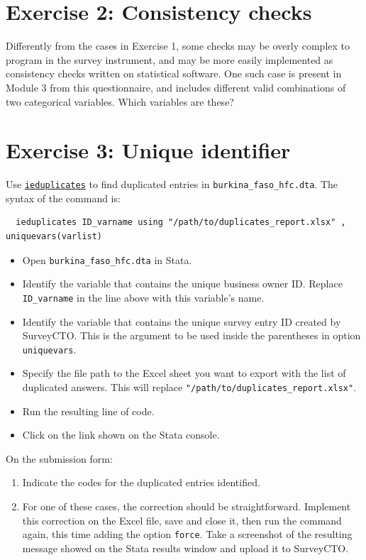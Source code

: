 \documentclass{tufte-handout}
\begin{document}
\section{Exercise 2: Consistency checks}
Differently from the cases in Exercise 1, some checks may be overly complex to program in the survey instrument, and may be more easily implemented as consistency checks written on statistical software. One such case is present in Module 3 from this questionnaire, and includes different valid combinations of two categorical variables. Which variables are these?

\section{Exercise 3: Unique identifier}

Use \textcolor{blue}{\href{https://dimewiki.worldbank.org/wiki/Ieduplicates}{\texttt{ieduplicates}}} to find duplicated entries in \texttt{burkina\_faso\_hfc.dta}. The syntax of the command is: 
\begin{Verbatim}
  ieduplicates ID_varname using "/path/to/duplicates_report.xlsx" , uniquevars(varlist)
\end{Verbatim}

\begin{itemize}
	\item Open \texttt{burkina\_faso\_hfc.dta} in Stata.
	\item Identify the variable that contains the unique business owner ID. Replace \texttt{ID\_varname} in the line above with this variable's name.
	\item Identify the variable that contains the unique survey entry ID created by SurveyCTO. This is the argument to be used inside the parentheses in option \texttt{uniquevars}.
	\item Specify the file path to the Excel sheet you want to export with the list of duplicated answers. This will replace \texttt{"/path/to/duplicates\_report.xlsx"}.
	\item Run the resulting line of code.
	\item Click on the link shown on the Stata console.
\end{itemize}

On the submission form:
\begin{enumerate}
	\item Indicate the codes for the duplicated entries identified.
	\item For one of these cases, the correction should be straightforward. Implement this correction on the Excel file, save and close it, then run the command again, this time adding the option \texttt{force}. Take a screenshot of the resulting message showed on the Stata results window and upload it to SurveyCTO. 
\end{enumerate} 
\end{document}
